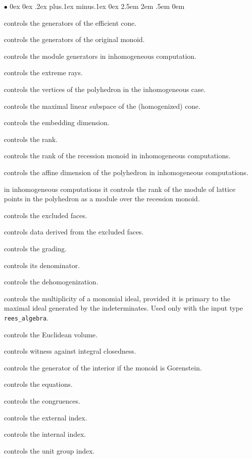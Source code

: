 \documentclass[12pt,a4paper]{scrartcl}
\newcommand{\stdli}{ \topsep0ex \partopsep0ex %
\parsep.2ex plus.1ex minus.1ex \itemsep0ex%
\leftmargin2.5em \labelwidth2em \labelsep.5em \rightmargin0em}%
\renewenvironment{itemize}{\begin{list}{{$\bullet$}}{\stdli}}{\end{list}}
\theoremstyle{definition}
\def\itemtt[#1]{\item[\textbf{\ttt{#1}}]}
\def\ttt{\texttt}
\begin{document}
\begin{itemize}
	
	\itemtt[Generators] controls the generators of the efficient cone.
	
	\itemtt[OriginalMonoidGenerators] controls the generators of the original monoid.
		
	\itemtt[ModuleGenerators] controls the module generators in inhomogeneous computation.
	
	\itemtt[ExtremeRays] controls the extreme rays.
		
	\itemtt[VerticesOfPolyhedron] controls the vertices of the polyhedron in the inhomogeneous case.
	
	\itemtt[MaximalSubspace] controls the maximal linear subspace of the (homogenized) cone.		
	
	\itemtt [EmbeddingDim] controls the embedding dimension.
	\itemtt [Rank] controls the rank.
	
	\itemtt[RecessionRank]  controls the rank of the recession monoid in inhomogeneous computations.
	
	\itemtt[AffineDim]  controls the affine dimension of the polyhedron in inhomogeneous computations.
	
	\itemtt[ModuleRank] in inhomogeneous computations it controls the rank of the module of lattice points in the polyhedron as a module over the recession monoid. 
	
	\itemtt[ExcludedFaces] controls the excluded faces.
	
	\itemtt[InclusionExclusionData] controls data derived from the excluded faces.
	
	\itemtt[Grading] controls the grading.
	\itemtt[GradingDenom] controls its denominator.
	
	\itemtt[Dehomogenization] controls the dehomogenization.
	
	\itemtt[ReesPrimaryMultiplicity] controls the multiplicity of a monomial ideal, provided it is primary to the maximal ideal generated by the indeterminates. Used only with the input type \verb|rees_algebra|.
	
	\itemtt[EuclideanVolume]controls the Euclidean volume.
	
	\itemtt [WitnessNotIntegrallyClosed] controls  witness against integral closedness.
	\itemtt [GeneratorOfInterior] controls  the generator of the interior if the monoid is Gorenstein.
	
	\itemtt[Equations] controls the equations.
	\itemtt[Congruences] controls the congruences.
	\itemtt[ExternalIndex]  controls the external index.
	\itemtt[InternalIndex]  controls the internal index.
	\itemtt[UnitGroupIndex]  controls the unit group index.


\end{itemize}
\end{document}
